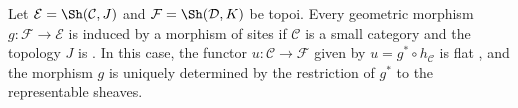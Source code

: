 \begin{proposition} \label{proposition:morphism_of_topoi_from_functor}
    \TODO{}
    Let $\mathcal{E} = \Sh(\mathcal{C}, J)$ and $\mathcal{F} = \Sh(\mathcal{D}, K)$ be topoi. 
    Every geometric morphism $g: \mathcal{F} \to \mathcal{E}$ is induced by a morphism of sites if $\mathcal{C}$ is a small category and the topology $J$ is . 
    In this case, the functor $u: \mathcal{C} \to \mathcal{F}$ given by $u = g^* \circ h_{\mathcal{C}}$ is flat , and the morphism $g$ is uniquely determined by the restriction of $g^*$ to the representable sheaves.
\end{proposition}